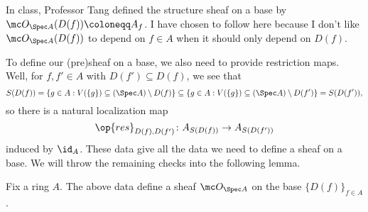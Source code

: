 \documentclass[../notes.tex]{subfiles}
\begin{document}
\begin{remark}[Nir]
	In class, Professor Tang defined the structure sheaf on a base by $\mc O_{\Spec A}(D(f))\coloneqq A_f$. I have chosen to follow \cite{rising-sea} here because I don't like $\mc O_{\Spec A}(D(f))$ to depend on $f\in A$ when it should only depend on $D(f)$.
\end{remark}
To define our (pre)sheaf on a base, we also need to provide restriction maps. Well, for $f,f'\in A$ with $D(f')\subseteq D(f)$, we see that
\[S(D(f))=\{g\in A:V(\{g\})\subseteq(\Spec A)\setminus D(f)\}\subseteq\{g\in A:V(\{g\})\subseteq(\Spec A)\setminus D(f')\}=S(D(f')),\]
so there is a natural localization map
\[\op{res}_{D(f),D(f')}\colon A_{S(D(f))}\to A_{S(D(f'))}\]
induced by $\id_A$. These data give all the data we need to define a sheaf on a base. We will throw the remaining checks into the following lemma.
\begin{lemma}
	Fix a ring $A$. The above data define a sheaf $\mc O_{\Spec A}$ on the base $\{D(f)\}_{f\in A}$.
\end{lemma}
\end{document}
